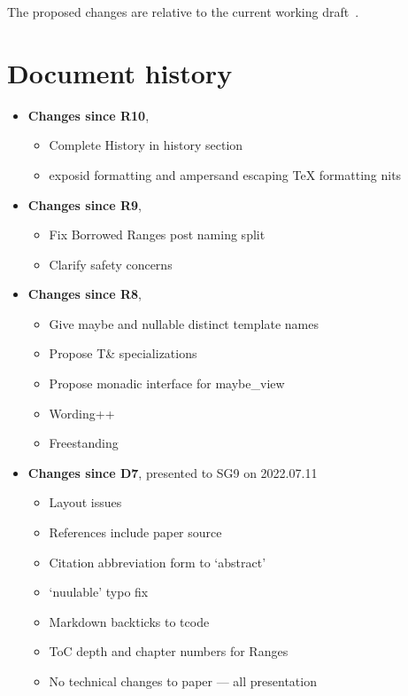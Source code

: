 \documentclass[a4paper,10pt,oneside,openany,final,article]{memoir}
\begin{document}
The proposed changes are relative to the current working draft~\cite{N4910}.

\chapter*{Document history}

\begin{itemize}
\item \textbf{Changes since R10},
  \begin{itemize}
  \item Complete History in history section
  \end{itemize}
  \begin{itemize}
  \item exposid formatting and ampersand escaping TeX formatting nits
  \end{itemize}
\item \textbf{Changes since R9},
  \begin{itemize}
  \item Fix Borrowed Ranges post naming split
  \end{itemize}
  \begin{itemize}
  \item Clarify safety concerns
  \end{itemize}
\item \textbf{Changes since R8},
  \begin{itemize}
  \item Give maybe and nullable distinct template names
  \item Propose T\& specializations
  \item Propose monadic interface for maybe_view
  \item Wording++
  \item Freestanding
  \end{itemize}
\item \textbf{Changes since D7}, presented to SG9 on 2022.07.11
  \begin{itemize}
  \item Layout issues
  \item References include paper source
  \item Citation abbreviation form to `abstract'
  \item `nuulable' typo fix
  \item Markdown backticks to tcode
  \item ToC depth and chapter numbers for Ranges
  \item No technical changes to paper --- all presentation

\end{itemize}
\end{itemize}
\end{document}
